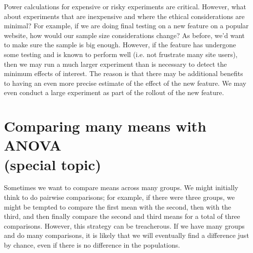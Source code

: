 Power calculations for expensive or risky experiments are critical. However, what about experiments that are inexpensive and where the ethical considerations are minimal? For example, if we are doing final testing on a new feature on a popular website, how would our sample size considerations change? As before, we'd want to make sure the sample is big enough. However, if the feature has undergone some testing and is known to perform well (i.e. not frustrate many site users), then we may run a much larger experiment than is necessary to detect the minimum effects of interest. The reason is that there may be additional benefits to having an even more precise estimate of the effect of the new feature. We may even conduct a large experiment as part of the rollout of the new feature.





\section[Comparing many means with ANOVA (special topic)]{Comparing many means with ANOVA\\(special topic)   ~}
\label{anovaAndRegrWithCategoricalVariables}


Sometimes we want to compare means across many groups. We might initially think to do pairwise comparisons; for example, if there were three groups, we might be tempted to compare the first mean with the second, then with the third, and then finally compare the second and third means for a total of three comparisons. However, this strategy can be treacherous. If we have many groups and do many comparisons, it is likely that we will eventually find a difference just by chance, even if there is no difference in the populations.

